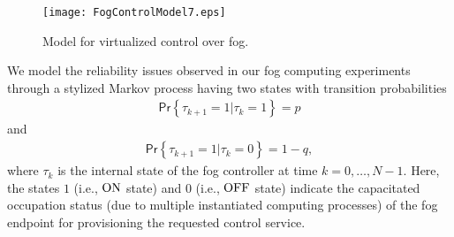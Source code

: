 \documentclass[10pt, journal, letterpaper]{IEEEtran}
\newcommand{\field}[1]{\ensuremath{\mathbb{#1}}}
\newcommand{\R}{\ensuremath{\field{R}}} %
\newcommand{\1}{\ensuremath{\mathbf{1}}} %
\newcommand{\PR}[1]{\ensuremath{\mathsf{Pr}\left\{#1\right\}}} %
\newcommand{\defeq}{\ensuremath{\triangleq}} %
\newcommand{\vecbold}[1]{\ensuremath{\boldsymbol{#1}}}
\newcommand{\on}{\ensuremath{{\rm ON}}}
\newcommand{\off}{\ensuremath{{\rm OFF}}}
\begin{document}
\begin{figure}[!t]
\begin{center}
\texttt{[image: FogControlModel7.eps]}
\end{center}
\caption{Model for virtualized control over fog.} \label{Fig: System Model}
\end{figure}

We model the reliability issues observed in our fog computing experiments through a stylized Markov process having two states with transition probabilities
\begin{eqnarray*}
\PR{\tau_{k+1} = 1 \big| \tau_{k} = 1} = p
\end{eqnarray*}
and
\begin{eqnarray*}
\PR{\tau_{k+1} = 1 \big| \tau_{k} = 0} = 1-q,
\end{eqnarray*}
where $\tau_k$ is the internal state of the fog controller at time $k = 0, \ldots, N-1$. Here, the states $1$ (i.e., $\on$ state) and $0$ (i.e., $\off$ state) indicate the capacitated occupation status (due to multiple instantiated computing processes) of the fog endpoint for provisioning  the requested control service.
\end{document}
